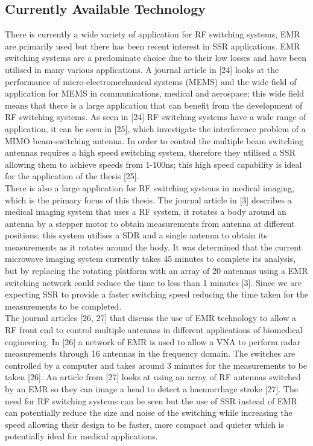 \documentclass[12pt,openany,a4paper]{book}
\begin{document}
\subsection{Currently Available Technology}
There is currently a wide variety of application for RF switching systems, EMR are primarily used but there has been recent interest in SSR applications. EMR switching systems are a predominate choice due to their low losses and have been utilised in many various applications. A journal article in [24] looks at the performance of micro-electromechanical systems (MEMS) and the wide field of application for MEMS in communications, medical and aerospace; this wide field means that there is a large application that can benefit from the development of RF switching systems. As seen in [24] RF switching systems have a wide range of application, it can be seen in [25], which investigate the interference problem of a MIMO beam-switching antenna. In order to control the multiple beam switching antennas requires a high speed switching system, therefore they utilised a SSR allowing them to achieve speeds from 1-100ns; this high speed capability is ideal for the application of the thesis [25].\\
There is also a large application for RF switching systems in medical imaging, which is the primary focus of this thesis. The journal article in [3] describes a medical imaging system that uses a RF system, it rotates a body around an antenna by a stepper motor to obtain measurements from antenna at different positions; this system utilises a SDR and a single antenna to obtain its measurements as it rotates around the body. It was determined that the current microwave imaging system currently takes 45 minutes to complete its analysis, but by replacing the rotating platform with an array of 20 antennas using a EMR switching network could reduce the time to less than 1 minutes [3]. Since we are expecting SSR to provide a faster switching speed reducing the time taken for the measurements to be completed.\\
The journal articles [26, 27] that discuss the use of EMR technology to allow a RF front end to control multiple antennas in different applications of biomedical engineering. In [26] a network of EMR is used to allow a VNA to perform radar measurements through 16 antennas in the frequency domain. The switches are controlled by a computer and takes around 3 minutes for the measurements to be taken [26]. An article from [27] looks at using an array of RF antennas switched by an EMR so they can image a head to detect a haemorrhage stroke [27]. The need for RF switching systems can be seen but the use of SSR instead of EMR can potentially reduce the size and noise of the switching while increasing the speed allowing their design to be faster, more compact and quieter which is potentially ideal for medical applications. 
\end{document}
